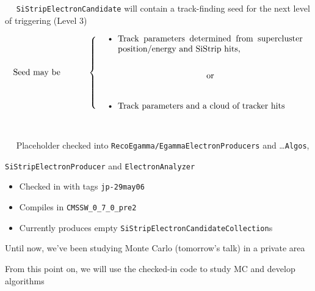 \documentclass[landscape]{article}
\newenvironment{slide}[1][ ]{\mbox{\bf #1 } \vfill}{\vfill \mbox{ } \hfill \Large \arabic{page} \pagebreak}
\begin{document}
\begin{slide}
{\tt SiStripElectronCandidate} will contain a track-finding seed for the next level of triggering (Level 3)

\vfill
\[ \mbox{Seed may be \mbox{\hspace{1 cm}}} \left\{
\mbox{\begin{minipage}{0.7\linewidth}
\begin{itemize}

\item Track parameters determined from supercluster position/energy and SiStrip hits,

\vspace{0.25 cm}
\begin{center}
or
\end{center}

\vspace{0.25 cm}
\item Track parameters and a cloud of tracker hits
\end{itemize}
\end{minipage}} \right. \]

\end{slide}

\begin{slide}
Placeholder checked into {\tt RecoEgamma/EgammaElectronProducers} and \ldots{\tt Algos},

\vfill
\begin{center}
{\tt SiStripElectronProducer} and {\tt ElectronAnalyzer}
\end{center}

\vfill
\begin{itemize}\setlength{\itemsep}{0.75 cm}

\item Checked in with tags {\tt jp-29may06}

\item Compiles in {\tt CMSSW\_0\_7\_0\_pre2}

\item Currently produces empty {\tt SiStripElectronCandidateCollection}s

\end{itemize}

\vfill
\begin{center}
\begin{minipage}{0.85\linewidth}
Until now, we've been studying Monte Carlo (tomorrow's talk) in a private area
\end{minipage}
\end{center}

\vfill
\begin{center}
\begin{minipage}{0.85\linewidth}
From this point on, we will use the checked-in code to study MC and
develop algorithms
\end{minipage}
\end{center}
\end{slide}
\end{document}
